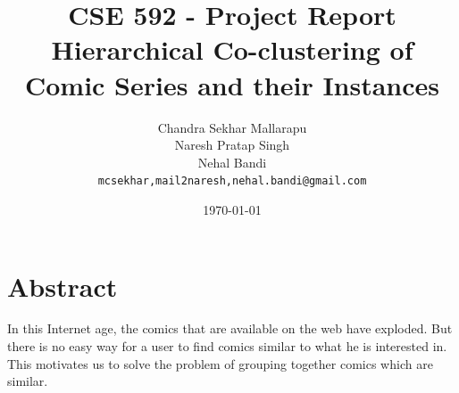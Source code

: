 \documentclass[11pt]{article}
\begin{document}
\title{CSE 592 - Project Report\\
  Hierarchical Co-clustering of Comic Series and their Instances}
\author{
  Chandra Sekhar Mallarapu\\
  Naresh Pratap Singh\\
  Nehal Bandi\\
  \texttt{mcsekhar,mail2naresh,nehal.bandi@gmail.com}}
\date{\today}
\maketitle
\tableofcontents
\listoffigures
\pagebreak

\section{Abstract}
In this Internet age, the comics that are available on the web have exploded. But there is no easy way for a user to find comics similar to what he is interested in. This motivates us to solve the problem of grouping together comics which are similar.
\end{document}
